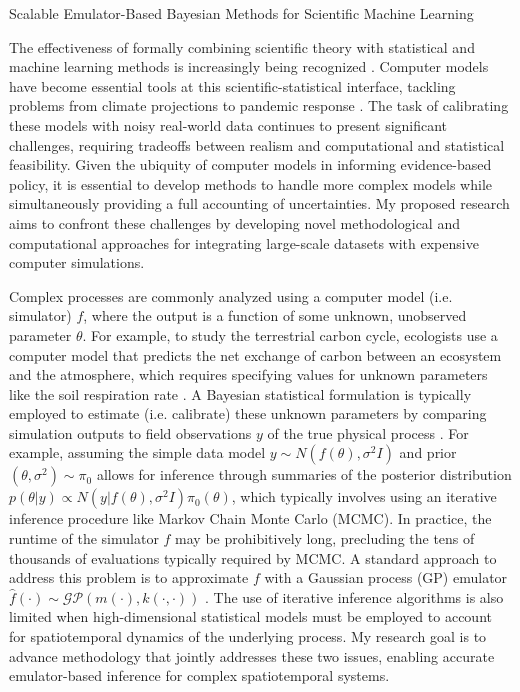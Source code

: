 \documentclass[11pt]{article}
\begin{document}
\begin{center}
Scalable Emulator-Based Bayesian Methods for Scientific Machine Learning
\end{center}

The effectiveness of formally combining scientific theory with statistical and machine learning methods is increasingly being recognized \cite{Willcox, Laubmeier, Wikle}. 
 Computer models have become essential tools at this scientific-statistical interface, tackling problems from 
climate projections \cite{Canadell} to pandemic response \cite{Swallow}. The task of calibrating these models with noisy real-world data continues to present
significant challenges, requiring tradeoffs between realism and computational and statistical feasibility. Given the ubiquity of computer models in informing
 evidence-based policy, it is essential to develop methods to handle more complex models while simultaneously providing a full accounting of uncertainties.
 My proposed research aims to confront these challenges by developing novel methodological and computational approaches for integrating large-scale datasets with expensive computer simulations. 

Complex processes are commonly analyzed using a computer model (i.e. simulator) $f$, where the output is a function of some unknown, unobserved parameter $\theta$.
For example, to study the terrestrial carbon cycle, ecologists use a computer model 
that predicts the net exchange of carbon between an ecosystem and the atmosphere, which requires specifying values for unknown parameters like the soil respiration rate \cite{Fer}.
A Bayesian statistical formulation is typically employed to estimate (i.e. calibrate) these unknown parameters by comparing simulation outputs to field observations $y$ of the true physical process \cite{Kennedy}. For example, assuming the simple data model $y \sim N(f(\theta), \sigma^2 I)$ and prior $(\theta, \sigma^2) \sim \pi_0$ allows for inference through summaries of the posterior distribution $p(\theta|y) \propto N(y|f(\theta), \sigma^2 I)\pi_0(\theta)$, which typically involves using an iterative inference procedure like Markov Chain Monte Carlo (MCMC). In practice, the runtime of the simulator $f$ may be prohibitively long, precluding the tens of thousands of evaluations typically required by MCMC. A standard approach to address this problem is to approximate $f$ with a Gaussian process (GP) emulator $\hat{f}(\cdot) \sim \mathcal{GP}(m(\cdot), k(\cdot, \cdot))$ \cite{Fer, Kennedy, Cleary}. The use of iterative inference algorithms is also limited when high-dimensional statistical models must be employed to account for spatiotemporal dynamics of the underlying process. My research goal is to advance methodology that jointly addresses these two issues, enabling accurate emulator-based inference for complex spatiotemporal systems. 
\end{document}
